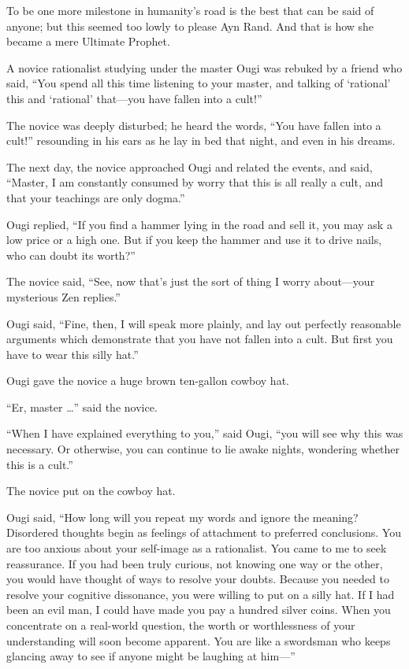 {
 To be one more milestone in humanity's road is the
best that can be said of anyone; but this seemed too lowly to please
Ayn Rand. And that is how she became a mere Ultimate Prophet.}

\myendsectiontext


\bigskip

\label{two_cult_koans}

{
 A novice rationalist studying under the master Ougi was rebuked by
a friend who said, ``You spend all this time listening
to your master, and talking of
`rational' this and
`rational' that---you have fallen into a
cult!'' }

{
 The novice was deeply disturbed; he heard the words,
``You have fallen into a cult!''
resounding in his ears as he lay in bed that night, and even in his
dreams.}

{
 The next day, the novice approached Ougi and related the events,
and said, ``Master, I am constantly consumed by worry
that this is all really a cult, and that your teachings are only
dogma.''}

{
 Ougi replied, ``If you find a hammer lying in the
road and sell it, you may ask a low price or a high one. But if you
keep the hammer and use it to drive nails, who can doubt its
worth?''}

{
 The novice said, ``See, now
that's just the sort of thing I worry about---your
mysterious Zen replies.''}

{
 Ougi said, ``Fine, then, I will speak more
plainly, and lay out perfectly reasonable arguments which demonstrate
that you have not fallen into a cult. But first you have to wear this
silly hat.''}

{
 Ougi gave the novice a huge brown ten-gallon cowboy hat.}

{
 ``Er, master \ldots'' said the
novice.}

{
 ``When I have explained everything to
you,'' said Ougi, ``you will see why
this was necessary. Or otherwise, you can continue to lie awake nights,
wondering whether this is a cult.''}

{
 The novice put on the cowboy hat.}

{
 Ougi said, ``How long will you repeat my words
and ignore the meaning? Disordered thoughts begin as feelings of
attachment to preferred conclusions. You are too anxious about your
self-image as a rationalist. You came to me to seek reassurance. If you
had been truly curious, not knowing one way or the other, you would
have thought of ways to resolve your doubts. Because you needed to
resolve your cognitive dissonance, you were willing to put on a silly
hat. If I had been an evil man, I could have made you pay a hundred
silver coins. When you concentrate on a real-world question, the worth
or worthlessness of your understanding will soon become apparent. You
are like a swordsman who keeps glancing away to see if anyone might be
laughing at him---''}


